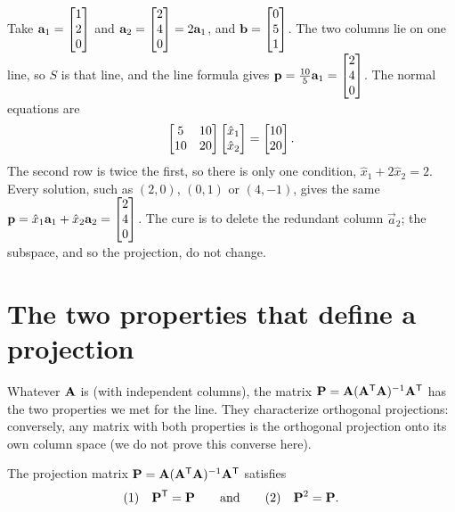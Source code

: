 \begin{example}\label{ch18:dependent}
Take $\mathbf{a}_1=\begin{bmatrix}1\\2\\0\end{bmatrix}$ and $\mathbf{a}_2=\begin{bmatrix}2\\4\\0\end{bmatrix}=2\mathbf{a}_1$, and
$\mathbf{b}=\begin{bmatrix}0\\5\\1\end{bmatrix}$. The two columns lie on one line, so $S$ is that line, and the line
formula gives $\mathbf{p}=\frac{10}{5}\mathbf{a}_1=\begin{bmatrix}2\\4\\0\end{bmatrix}$. The normal equations are
\[
  \begin{bmatrix} 5 & 10\\ 10 & 20 \end{bmatrix}\begin{bmatrix}\hat{x}_1\\ \hat{x}_2\end{bmatrix}
  = \begin{bmatrix}10\\20\end{bmatrix}.
\]
The second row is twice the first, so there is only one condition, $\hat{x}_1+2\hat{x}_2=2$. Every
solution, such as $(2,0)$, $(0,1)$ or $(4,-1)$, gives the same $\mathbf{p}=\hat{x}_1\mathbf{a}_1+
\hat{x}_2\mathbf{a}_2=\begin{bmatrix}2\\4\\0\end{bmatrix}$. The cure is to delete the redundant column $\vec{a}_2$; the
subspace, and so the projection, do not change.
\end{example}

\section{The two properties that define a projection}\label{ch18:sec-two-props}

Whatever $\mathbf{A}$ is (with independent columns), the matrix
$\mathbf{P}=\mathbf{A}(\mathbf{A}^{\mathsf{T}}\mathbf{A})^{-1}\mathbf{A}^{\mathsf{T}}$ has the two properties we met for the line. They
characterize orthogonal projections: conversely, any matrix with both properties is the orthogonal
projection onto its own column space (we do not prove this converse here).

\begin{theorem}\label{ch18:P-props}
The projection matrix $\mathbf{P}=\mathbf{A}(\mathbf{A}^{\mathsf{T}}\mathbf{A})^{-1}\mathbf{A}^{\mathsf{T}}$ satisfies
\[
  \text{(1)}\quad \mathbf{P}^{\mathsf{T}} = \mathbf{P}
  \qquad\text{and}\qquad
  \text{(2)}\quad \mathbf{P}^2 = \mathbf{P}.
\]
\end{theorem}

